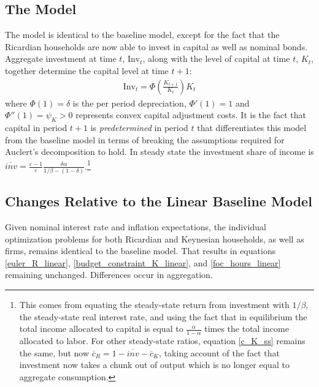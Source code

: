 \documentclass[12pt,a4paper]{article}
\begin{document}
\subsection{The Model}
The model is identical to the baseline model, except for the fact that the Ricardian households are now able to invest in capital as well as nominal bonds. Aggregate investment at time $t$, $\text{Inv}_t$, along with the level of capital at time $t$, $K_t$, together determine the capital level at time $t+1$:
\begin{align}
\text{Inv}_t = \Phi\left(\frac{K_{t+1}}{K_t}\right) K_t
\end{align}
where $\Phi(1) =\delta$ is the per period depreciation, $\Phi'(1) =1$ and $\Phi''(1) =\psi_K >0 $ represents convex capital adjustment costs. It is the fact that capital in period $t+1$ is \textit{predetermined} in period $t$ that differentiates this model from the baseline model in terms of breaking the assumptions required for Auclert's decomposition to hold. In steady state the investment share of income is $\overline{\textit{inv}} = \frac{\varepsilon-1}{\varepsilon} \frac{\delta \alpha}{1/\beta - (1-\delta)}$.\footnote{This comes from equating the steady-state return from investment with $1/\beta$, the steady-state real interest rate, and using the fact that in equilibrium the total income allocated to capital is equal to $\frac{\alpha}{1-\alpha}$ times the total income allocated to labor. For other steady-state ratios, equation \ref{c_K_ss} remains the same, but now $\overline{c}_{R}=1-\overline{\textit{inv}}-\overline{c}_{K}$, taking account of the fact that investment now takes a chunk out of output which is no longer equal to aggregate consumption.}

\subsection{Changes Relative to the Linear Baseline Model}
Given nominal interest rate and inflation expectations, the individual optimization problems for both Ricardian and Keynesian households, as well as firms, remains identical to the baseline model. That results in equations \ref{euler_R_linear}, \ref{budget_constraint_K_linear}, and \ref{foc_hours_linear} remaining unchanged. Differences occur in aggregation.
\end{document}
